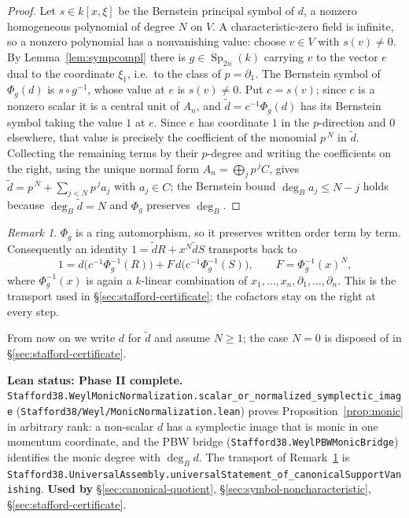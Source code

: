 \documentclass[11pt]{article}
\theoremstyle{plain}
\theoremstyle{definition}
\theoremstyle{remark}
\newtheorem{remark}[theorem]{Remark}
\theoremstyle{plain}
\newcommand{\Sp}{\operatorname{Sp}}
\begin{document}
\begin{proof}
Let $s\in k[x,\xi]$ be the Bernstein principal symbol of $d$, a nonzero
homogeneous polynomial of degree $N$ on $V$. A characteristic-zero field is
infinite, so a nonzero polynomial has a nonvanishing value: choose $v\in V$
with $s(v)\neq0$. By Lemma~\ref{lem:sympcompl} there is $g\in\Sp_{2n}(k)$
carrying $v$ to the vector $e$ dual to the coordinate $\xi_1$, i.e.\ to the
class of $p=\partial_1$. The Bernstein symbol of $\Phi_g(d)$ is
$s\circ g^{-1}$, whose value at $e$ is $s(v)\neq0$. Put $c=s(v)$; since $c$ is
a nonzero scalar it is a central unit of $A_n$, and $\tilde d=c^{-1}\Phi_g(d)$
has its Bernstein symbol taking the value $1$ at $e$. Since $e$ has coordinate
$1$ in the $p$-direction and $0$ elsewhere, that value is precisely the
coefficient of the monomial $p^{\,N}$ in $\tilde d$. Collecting the remaining
terms by their $p$-degree and writing the coefficients on the right, using the
unique normal form $A_n=\bigoplus_j p^{\,j}C$, gives
$\tilde d=p^{\,N}+\sum_{j<N}p^{\,j}a_j$ with $a_j\in C$; the Bernstein bound
$\deg_B a_j\le N-j$ holds because $\deg_B\tilde d=N$ and $\Phi_g$ preserves
$\deg_B$.
\end{proof}

\begin{remark}\label{rem:transport}
$\Phi_g$ is a ring automorphism, so it preserves written order term by term.
Consequently an identity $1=\tilde dR+x^N\tilde dS$ transports back to
\[
  1=d\bigl(c^{-1}\Phi_g^{-1}(R)\bigr)+F\,d\bigl(c^{-1}\Phi_g^{-1}(S)\bigr),
  \qquad F=\Phi_g^{-1}(x)^N,
\]
where $\Phi_g^{-1}(x)$ is again a $k$-linear combination of
$x_1,\dots,x_n,\partial_1,\dots,\partial_n$. This is the transport used in
\S\ref{sec:stafford-certificate}; the cofactors stay on the right at every
step.
\end{remark}

From now on we write $d$ for $\tilde d$ and assume $N\ge1$; the case $N=0$ is
disposed of in \S\ref{sec:stafford-certificate}.

\begin{provbox}
\textbf{Lean status: Phase II complete.}
\texttt{Stafford38.\allowbreak WeylMonicNormalization.\allowbreak scalar\_or\_normalized\_symplectic\_image}
(\texttt{Stafford38/Weyl/MonicNormalization.lean}) proves
Proposition~\ref{prop:monic} in arbitrary rank: a non-scalar $d$ has a
symplectic image that is monic in one momentum coordinate, and the PBW bridge
(\texttt{Stafford38.WeylPBWMonicBridge}) identifies the monic degree with
$\deg_Bd$. The transport of Remark~\ref{rem:transport} is
\texttt{Stafford38.\allowbreak UniversalAssembly.\allowbreak universalStatement\_of\_canonicalSupportVanishing}.
\textbf{Used by} \S\ref{sec:canonical-quotient}, \S\ref{sec:symbol-noncharacteristic},
\S\ref{sec:stafford-certificate}.
\end{provbox}
\end{document}
